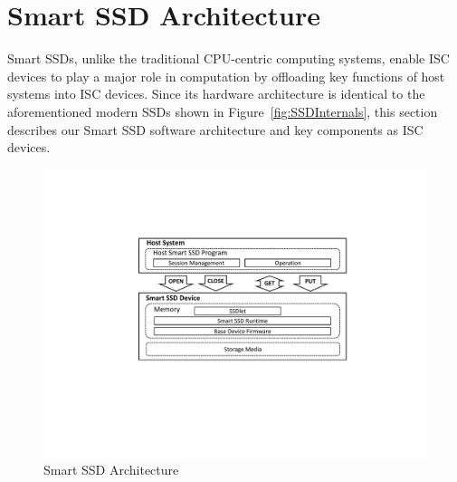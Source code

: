 
\section{Smart SSD Architecture}\label{sec:ssdArch}



Smart SSDs, unlike the traditional CPU-centric computing systems, enable ISC devices to play a major role in computation by offloading key functions of host systems into ISC devices. Since its hardware architecture is identical to the aforementioned modern SSDs shown in Figure~\ref{fig:SSDInternals}, this section describes our Smart SSD software architecture and key components as ISC devices.



\begin{figure}[htbp]
	\centering
		\includegraphics[width=1\columnwidth]{figures/SmartSSD_Architecture.pdf}
	\caption{\small Smart SSD Architecture}
	\label{fig:SmartSSD_arch}
\end{figure}

